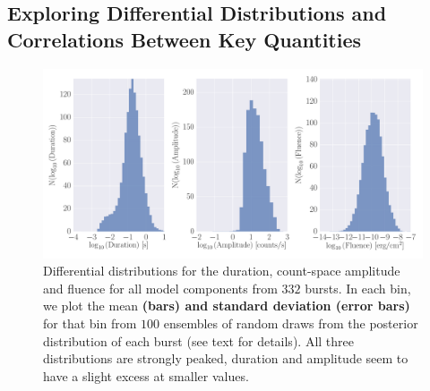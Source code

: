 \documentclass[12pt]{emulateapj}
\begin{document}
\subsection{Exploring Differential Distributions and Correlations Between Key Quantities}
\label{ch6:exploration}
  \begin{figure}[htbp]
\begin{center}
\includegraphics[width=\textwidth]{f7.pdf}%
\caption{Differential distributions for the duration, count-space amplitude and fluence for all model components from $332$ bursts. In each bin, we plot the mean {\bf (bars) and standard deviation (error bars)}  for
that bin from $100$ ensembles of random draws from the posterior distribution of each burst (see text for details). All three distributions are 
strongly peaked, duration and amplitude seem to have a slight excess at smaller values.}
\label{fig:diffdist}
\end{center}
\end{figure}
\end{document}

